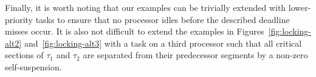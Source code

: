 Finally, it is worth noting that our examples can be trivially extended with lower-priority tasks to ensure that no processor idles before the described deadline misses occur. It is also not difficult to extend the examples in Figures~\ref{fig:locking-alt2} and~\ref{fig:locking-alt3} with a task on a third processor such that all critical sections of $\tau_1$ and $\tau_2$ are separated from their predecessor segments by a non-zero self-suspension.
